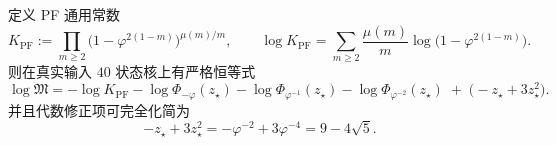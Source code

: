 \begin{corollary}\label{cor:logM-mu-pochhammer-split}
定义 PF 通用常数
\[
K_{\mathrm{PF}}
:=\prod_{m\ge 2}\bigl(1-\varphi^{2(1-m)}\bigr)^{\mu(m)/m},
\qquad
\log K_{\mathrm{PF}}
=\sum_{m\ge 2}\frac{\mu(m)}{m}\log\bigl(1-\varphi^{2(1-m)}\bigr).
\]
则在真实输入 \(40\) 状态核上有严格恒等式
\[
\boxed{
\log\mathfrak{M}
=-\log K_{\mathrm{PF}}
-\log\Phi_{-\varphi}(z_\star)
-\log\Phi_{\varphi^{-1}}(z_\star)
-\log\Phi_{\varphi^{-2}}(z_\star)
\;+\;\bigl(-z_\star+3z_\star^2\bigr).
}
\]
并且代数修正项可完全化简为
\[
-z_\star+3z_\star^2=-\varphi^{-2}+3\varphi^{-4}=9-4\sqrt5.
\]
\end{corollary}
